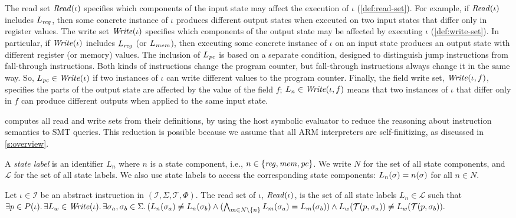 The read set $\mathit{Read}(\iota)$ specifies which components of the input state may
affect the execution of $\iota$ (\autoref{def:read-set}). For example, if
$\mathit{Read}(\iota)$ includes $L_\mathit{reg}$, then some concrete instance of $\iota$
produces different output states when executed on two input states that differ
only in register values. 
%
The write set $\mathit{Write}(\iota)$ specifies which components of the output state may
be affected by executing $\iota$ (\autoref{def:write-set}). In particular, if
$\mathit{Write}(\iota)$ includes $L_\mathit{reg}$ (or $L_\mathit{mem}$), then executing some concrete
instance of $\iota$ on an input state produces an output state with different
register (or memory) values. The inclusion of $L_\mathit{pc}$ is based on a separate
condition, designed to distinguish jump instructions from fall-through
instructions. Both kinds of instructions change the program counter, but
fall-through instructions always change it in the same way. So,
$L_\mathit{pc}\in\mathit{Write}(\iota)$ if two instances of $\iota$ can write different values
to the program counter.
%
Finally, the field write set, $\mathit{Write}(\iota, f)$, specifies the parts of the
output state are affected by the value of the field $f$; $L_n \in
\mathit{Write}(\iota, f)$ means that two instances of $\iota$ that differ only in $f$
can produce different outputs when applied to the same input state.\tighten

\jitsynth computes all read and write sets from their definitions, by using the
host symbolic evaluator to reduce the reasoning about instruction semantics to
SMT queries. This reduction is possible because we assume that all ARM
interpreters are self-finitizing, as discussed in \autoref{s:overview}.

\begin{definition}\label{def:state-labels} 
  A \emph{state label} is an identifier $L_n$ where $n$ is a state component,
  i.e., $n\in \{\mathit{reg},\mathit{mem},\mathit{pc}\}$. We write $N$ for the set of all state
  components, and $\mathcal{L}$ for the set of all state labels. We also use
  state labels to access the corresponding state components:
  $L_n(\sigma) = n(\sigma)$ for all $n\in N$.
\end{definition}

\begin{definition}\label{def:read-set}
  Let $\iota\in\mathcal{I}$ be an abstract instruction in $(\mathcal{I},
  \Sigma, \mathcal{T}, \Phi)$. The \textup{read set} of $\iota$,
  $\mathit{Read}(\iota)$, is the set of all state labels $L_n\in\mathcal{L}$ such that 
  $
    \exists p\in P(\iota).\, 
    \exists L_w \in\mathit{Write}(\iota).\,
    \exists \sigma_a, \sigma_b \in\Sigma.\,
    (L_n(\sigma_a) \neq L_n(\sigma_b) \wedge 
    (\bigwedge_{m\in N \setminus \{ n \}} L_m(\sigma_a) = L_m(\sigma_b)) \wedge
    L_w(\mathcal{T}(p,\sigma_a)) \neq L_w(\mathcal{T}(p,\sigma_b)).
  $\tighten
\end{definition}

